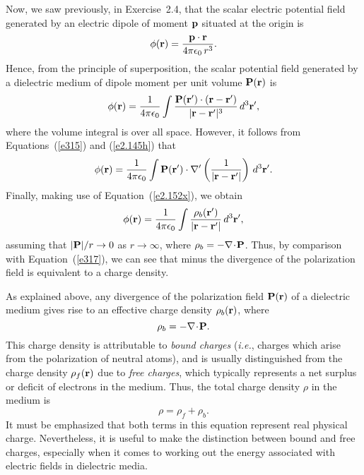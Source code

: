 Now, we saw previously,  in Exercise~2.4, that the scalar electric potential field generated by an
electric dipole of  moment ${\bf p}$ situated at the origin is
\begin{equation}
\phi({\bf r}) = \frac{{\bf p}\cdot{\bf r}}{4\pi\epsilon_0\,r^3}.
\end{equation}
Hence, from the principle of superposition, the scalar potential field
generated by a dielectric medium of dipole moment per unit volume ${\bf  P}({\bf r})$ is
\begin{equation}
\phi({\bf r}) = \frac{1}{4\pi\epsilon_0}\int\frac{{\bf P}({\bf r}')\cdot({\bf r}-{\bf r}')}{|{\bf r}-{\bf r}'|^3}\,d^3{\bf r}',
\end{equation}
where the volume integral is over all space. However, it follows from Equations~(\ref{e315}) and (\ref{e2.145h}) that
\begin{equation}
\phi({\bf r}) = \frac{1}{4\pi\epsilon_0}\int{\bf P}({\bf r}')\cdot\nabla' \left(\frac{1}{|{\bf r}-{\bf r}'|}\right)\,d^3{\bf r}'.
\end{equation}
Finally, making use of Equation~(\ref{e2.152x}), we obtain
\begin{equation}
\phi({\bf r}) = \frac{1}{4\pi\epsilon_0}\int \frac{\rho_b({\bf r}')}{|{\bf r}-{\bf r}'|}\,d^3{\bf r}',
\end{equation}
assuming that $|{\bf P}|/r\rightarrow 0$ as $r \rightarrow\infty$,
where $\rho_b =- \nabla\!\cdot\!{\bf P}$.
Thus, by comparison with Equation~(\ref{e317}), we can see that minus the divergence
of the polarization field  is equivalent to a charge density.

As explained above, any divergence of the polarization
field ${\bf P}({\bf r})$ of a dielectric medium gives rise to an effective charge density
$\rho_b({\bf r})$, where
\begin{equation}\label{e6.2}
\rho_b = -\nabla\!\cdot\!{\bf P}.
\end{equation}
This charge density is attributable to {\em bound charges} ({\em i.e.},
charges which arise from the polarization of neutral atoms), and
is usually distinguished from the charge density  $\rho_f({\bf r})$ due to
{\em free charges}, which typically represents a net surplus or
deficit of electrons in the medium. Thus, the total
charge density $\rho$ in the medium is
\begin{equation}
\rho = \rho_f + \rho_b.
\end{equation}
It must be emphasized that both terms in this equation represent real
physical charge. Nevertheless, it is useful to make the distinction
between bound and free charges, especially when it comes to working out
the energy associated with electric fields in dielectric media. 

